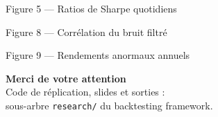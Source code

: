 \documentclass[10pt,aspectratio=169]{beamer}
\begin{document}
\begin{frame}{Figure 5 --- Ratios de Sharpe quotidiens}
\end{frame}

\begin{frame}{Figure 8 --- Corrélation du bruit filtré}
\end{frame}

\begin{frame}{Figure 9 --- Rendements anormaux annuels}
\end{frame}


\begin{frame}[plain]
  \begin{center}
    \Large\textbf{Merci de votre attention}\\[6pt]
    \small Code de réplication, slides et sorties :\\
    sous-arbre \texttt{research/} du backtesting framework.\\[8pt]
  \end{center}
\end{frame}
\end{document}

